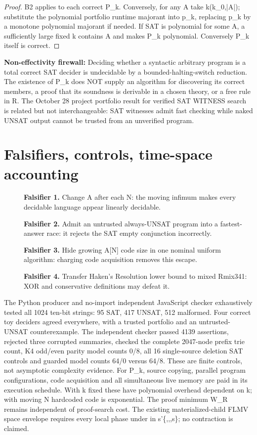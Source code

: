 \documentclass[11pt]{article}
\begin{document}
\begin{proof}
B2 applies to each correct P_k. Conversely, for any A take k\ge\max(k_0,|\langle A\rangle|); substitute the polynomial portfolio runtime majorant into p_k, replacing p_k by a monotone polynomial majorant if needed. If SAT is polynomial for some A, a sufficiently large fixed k contains A and makes P_k polynomial. Conversely P_k itself is correct.
\end{proof}
\noindent\textbf{Non-effectivity firewall:} Deciding whether a syntactic arbitrary program is a total correct SAT decider is undecidable by a bounded-halting-switch reduction. The existence of P_k does NOT supply an algorithm for discovering its correct members, a proof that its soundness is derivable in a chosen theory, or a free rule in R. The October 28 project portfolio result for verified SAT WITNESS search is related but not interchangeable: SAT witnesses admit fast checking while naked UNSAT output cannot be trusted from an unverified program.
\section{Falsifiers, controls, time-space accounting}
\begin{description}
\item[]\textbf{Falsifier 1.} Change A after each N: the moving infimum makes every decidable language appear linearly decidable.
\item[]\textbf{Falsifier 2.} Admit an untrusted always-UNSAT program into a fastest-answer race: it rejects the SAT empty conjunction incorrectly.
\item[]\textbf{Falsifier 3.} Hide growing A[N] code size in one nominal uniform algorithm: charging code acquisition removes this escape.
\item[]\textbf{Falsifier 4.} Transfer Haken's Resolution lower bound to mixed Rmix341: XOR and conservative definitions may defeat it.
\end{description}
The Python producer and no-import independent JavaScript checker exhaustively tested all 1024 ten-bit strings: 95 SAT, 417 UNSAT, 512 malformed. Four correct toy deciders agreed everywhere, with a trusted portfolio and an untrusted-UNSAT counterexample. The independent checker passed 4139 assertions, rejected three corrupted summaries, checked the complete 2047-node prefix trie count, K4 odd/even parity model counts 0/8, all 16 single-source deletion SAT controls and guarded model counts 64/0 versus 64/8. These are finite controls, not asymptotic complexity evidence.
For P_k, source copying, parallel program configurations, code acquisition and all simultaneous live memory are paid in its execution schedule. With k fixed these have polynomial overhead dependent on k; with moving N hardcoded code is exponential. The proof minimum W_R remains independent of proof-search cost. The existing materialized-child FLMV space envelope requires every local phase under \rho in s'\le\max\{\rho,\eta,\lambda,\lambda s\}; no contraction is claimed.
\end{document}
